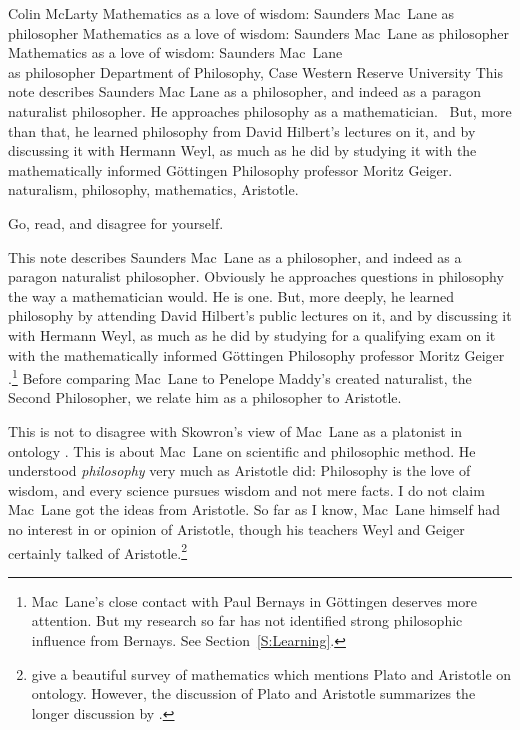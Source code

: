 \begin{artengenv}{Colin McLarty}
	{Mathematics as a love of wisdom: Saunders Mac~Lane as philosopher}
	{Mathematics as a love of wisdom: Saunders Mac~Lane as philosopher}
	{Mathematics as a love of wisdom: Saunders Mac~Lane\\as philosopher}
	{Department of Philosophy, Case Western Reserve University}
	{This note describes Saunders Mac Lane as a philosopher, and indeed as a paragon naturalist philosopher. He approaches philosophy as a mathematician.  But, more than that, he learned philosophy from David Hilbert's lectures on it, and by discussing it with Hermann Weyl, as much as he did by studying it with the mathematically informed Göttingen Philosophy professor Moritz Geiger.}
	{naturalism, philosophy, mathematics, Aristotle.}


\vspace{3ex}
\begin{flushright}
  Go, read, and disagree for yourself.\\\parencite[p.~390]{MacLBell46}
\end{flushright}\vspace{3ex}

\lettrine[loversize=0.13,lines=2,lraise=-0.03,nindent=0em,findent=0.2pt]%
{T}{}his note describes Saunders Mac~Lane as a philosopher, and indeed as a paragon naturalist philosopher. Obviously he approaches questions in philosophy the way a mathematician would.  He is one.  But, more deeply, he learned philosophy by attending David Hilbert's public lectures on it, and by discussing it with Hermann Weyl, as much as he did by studying for a qualifying exam on it with the mathematically informed G\"ottingen Philosophy professor Moritz Geiger \parencite{McLSaundersLast,McLSaundersReck}.\footnote{Mac~Lane's close contact with Paul Bernays in G\"ottingen deserves more attention.  But my research so far has not identified strong philosophic influence from Bernays.  See Section~\ref{S:Learning}.}  Before comparing Mac~Lane to Penelope Maddy's created naturalist, the Second Philosopher, we relate him as a philosopher to Aristotle.


This is not to disagree with Skowron's view of Mac~Lane as a platonist in ontology \parencite{SkowTalk}.  This is about Mac~Lane on scientific and philosophic method.  He understood \textit{philosophy} very much as Aristotle did: Philosophy is the love of wisdom, and every science pursues wisdom and not mere facts.  I do not claim Mac~Lane got the ideas from Aristotle.  So far as I know, Mac~Lane himself had no interest in or opinion of Aristotle, though his teachers Weyl and Geiger certainly talked of Aristotle.\footnote{\textcite{BrowderMacL} give a beautiful survey of mathematics which mentions Plato and Aristotle on ontology.  However, the discussion of Plato and Aristotle summarizes the longer discussion by \textcite{BrowderRel}.}






\end{artengenv}
